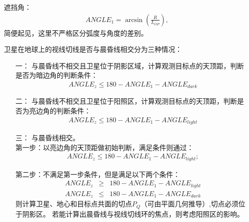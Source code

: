 遮挡角：
\begin{eqnarray}
ANGLE_1 = \arcsin\left(\frac{R}{L_{OP}}\right),
\end{eqnarray}
简便起见，这里不严格区分弧度与角度的差别。

卫星在地球上的视线切线是否与晨昏线相交分为三种情况：
\begin{itemize}

\item [一：]与晨昏线不相交且卫星位于阴影区域，计算观测目标点的天顶距，判断是否为暗边角的判断条件：
\begin{eqnarray}
ANGLE_z \le 180-ANGLE_1-ANGLE_{dark}
\end{eqnarray}

\item [二：]与晨昏线不相交且卫星位于阳照区，计算观测目标点的天顶距，判断是否为亮边角的判断条件：
\begin{eqnarray}
ANGLE_z \le 180-ANGLE_1-ANGLE_{light}
\end{eqnarray}

\item [三：]与晨昏线相交。\\
第一步：以亮边角的天顶距做初始判断，满足条件则通过：
\begin{eqnarray}
ANGLE_z \le 180-ANGLE_1-ANGLE_{light};
\end{eqnarray}

第二步：不满足第一步条件，但是满足以下两个条件：
\begin{eqnarray}
ANGLE_z &\ge& 180-ANGLE_1-ANGLE_{light}\\
ANGLE_z &\le& 180-ANGLE_1-ANGLE_{dark}
\end{eqnarray}
则计算卫星、地心和目标点共面的切点$P_{Q}$（可由平面几何推导）,切点必须位于阴影区。
若能计算出晨昏线与视线切线环的焦点，则考虑阳照区的影响。

\end{itemize}

